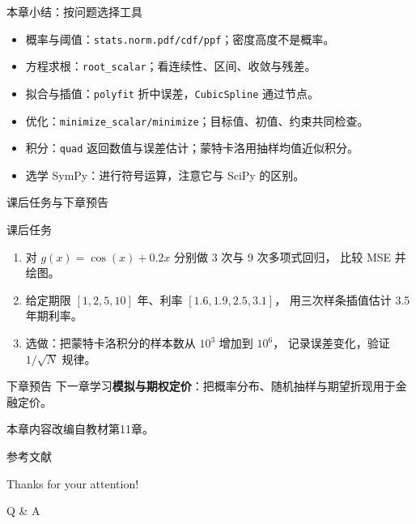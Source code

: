 \documentclass[9pt]{ctexbeamer}
\begin{document}
\begin{frame}{本章小结：按问题选择工具}
\begin{itemize}
\item 概率与阈值：\texttt{stats.norm.pdf/cdf/ppf}；密度高度不是概率。
\item 方程求根：\texttt{root\_scalar}；看连续性、区间、收敛与残差。
\item 拟合与插值：\texttt{polyfit} 折中误差，\texttt{CubicSpline} 通过节点。
\item 优化：\texttt{minimize\_scalar/minimize}；目标值、初值、约束共同检查。
\item 积分：\texttt{quad} 返回数值与误差估计；蒙特卡洛用抽样均值近似积分。
\item 选学 SymPy：进行符号运算，注意它与 SciPy 的区别。
\end{itemize}
\end{frame}

\begin{frame}{课后任务与下章预告}
	\begin{block}{课后任务}
		\begin{enumerate}
			\item 对 $g(x)=\cos(x)+0.2x$ 分别做 3 次与 9 次多项式回归，
				比较 MSE 并绘图。
			\item 给定期限 $[1,2,5,10]$ 年、利率 $[1.6, 1.9, 2.5, 3.1]$，
				用三次样条插值估计 3.5 年期利率。
			\item 选做：把蒙特卡洛积分的样本数从 $10^3$ 增加到 $10^6$，
				记录误差变化，验证 $1/\sqrt{N}$ 规律。
		\end{enumerate}
	\end{block}
	\begin{exampleblock}{下章预告}
		下一章学习\textbf{模拟与期权定价}：把概率分布、随机抽样与期望折现用于金融定价。
	\end{exampleblock}
	\begin{center}
		\vspace{0.5em}
		本章内容改编自教材第11章\citep{hilpisch2018python}。
	\end{center}
\end{frame}


\appendix

\begin{frame}[allowframebreaks]{参考文献}
	
	
\end{frame}

\begin{frame}
	\begin{center}
		{\Huge\calligra Thanks for your attention!}
		\vspace{1cm}

		{\Huge Q \& A}
	\end{center}
\end{frame}
\end{document}
